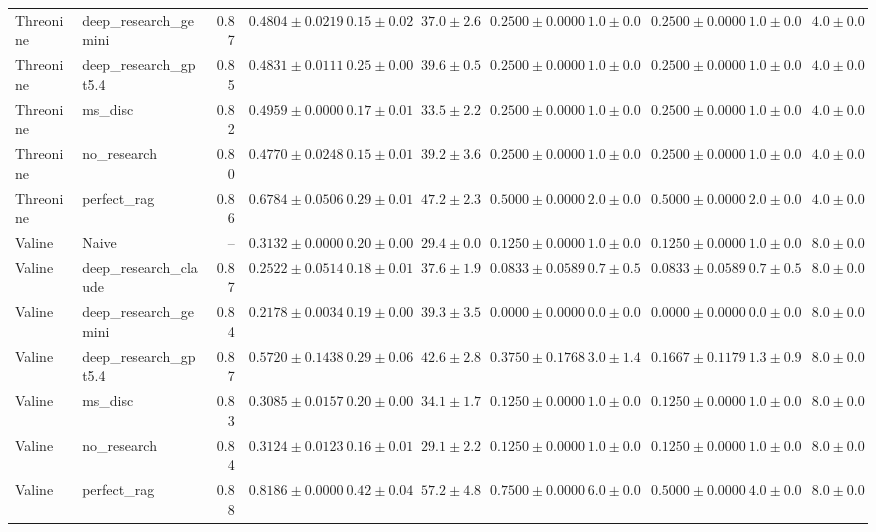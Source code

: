 \begin{table}[htbp]
\begin{tabular}{llrrrrrrrrr}
Threonine & deep_research_gemini & 0.87 & $0.4804 \pm 0.0219$ & $0.15 \pm 0.02$ & $37.0 \pm 2.6$ & $0.2500 \pm 0.0000$ & $1.0 \pm 0.0$ & $0.2500 \pm 0.0000$ & $1.0 \pm 0.0$ & $4.0 \pm 0.0$ \\
Threonine & deep_research_gpt5.4 & 0.85 & $0.4831 \pm 0.0111$ & $0.25 \pm 0.00$ & $39.6 \pm 0.5$ & $0.2500 \pm 0.0000$ & $1.0 \pm 0.0$ & $0.2500 \pm 0.0000$ & $1.0 \pm 0.0$ & $4.0 \pm 0.0$ \\
Threonine & ms_disc & 0.82 & $0.4959 \pm 0.0000$ & $0.17 \pm 0.01$ & $33.5 \pm 2.2$ & $0.2500 \pm 0.0000$ & $1.0 \pm 0.0$ & $0.2500 \pm 0.0000$ & $1.0 \pm 0.0$ & $4.0 \pm 0.0$ \\
Threonine & no_research & 0.80 & $0.4770 \pm 0.0248$ & $0.15 \pm 0.01$ & $39.2 \pm 3.6$ & $0.2500 \pm 0.0000$ & $1.0 \pm 0.0$ & $0.2500 \pm 0.0000$ & $1.0 \pm 0.0$ & $4.0 \pm 0.0$ \\
Threonine & perfect_rag & 0.86 & \cellcolor{green!25}$0.6784 \pm 0.0506$ & $0.29 \pm 0.01$ & $47.2 \pm 2.3$ & $0.5000 \pm 0.0000$ & $2.0 \pm 0.0$ & $0.5000 \pm 0.0000$ & $2.0 \pm 0.0$ & $4.0 \pm 0.0$ \\
\midrule
Valine & Naive & -- & $0.3132 \pm 0.0000$ & $0.20 \pm 0.00$ & $29.4 \pm 0.0$ & $0.1250 \pm 0.0000$ & $1.0 \pm 0.0$ & $0.1250 \pm 0.0000$ & $1.0 \pm 0.0$ & $8.0 \pm 0.0$ \\
Valine & deep_research_claude & 0.87 & $0.2522 \pm 0.0514$ & $0.18 \pm 0.01$ & $37.6 \pm 1.9$ & $0.0833 \pm 0.0589$ & $0.7 \pm 0.5$ & $0.0833 \pm 0.0589$ & $0.7 \pm 0.5$ & $8.0 \pm 0.0$ \\
Valine & deep_research_gemini & 0.84 & \cellcolor{red!25}$0.2178 \pm 0.0034$ & $0.19 \pm 0.00$ & $39.3 \pm 3.5$ & $0.0000 \pm 0.0000$ & $0.0 \pm 0.0$ & $0.0000 \pm 0.0000$ & $0.0 \pm 0.0$ & $8.0 \pm 0.0$ \\
Valine & deep_research_gpt5.4 & 0.87 & $0.5720 \pm 0.1438$ & $0.29 \pm 0.06$ & $42.6 \pm 2.8$ & $0.3750 \pm 0.1768$ & $3.0 \pm 1.4$ & $0.1667 \pm 0.1179$ & $1.3 \pm 0.9$ & $8.0 \pm 0.0$ \\
Valine & ms_disc & 0.83 & $0.3085 \pm 0.0157$ & $0.20 \pm 0.00$ & $34.1 \pm 1.7$ & $0.1250 \pm 0.0000$ & $1.0 \pm 0.0$ & $0.1250 \pm 0.0000$ & $1.0 \pm 0.0$ & $8.0 \pm 0.0$ \\
Valine & no_research & 0.84 & $0.3124 \pm 0.0123$ & $0.16 \pm 0.01$ & $29.1 \pm 2.2$ & $0.1250 \pm 0.0000$ & $1.0 \pm 0.0$ & $0.1250 \pm 0.0000$ & $1.0 \pm 0.0$ & $8.0 \pm 0.0$ \\
Valine & perfect_rag & 0.88 & \cellcolor{green!25}$0.8186 \pm 0.0000$ & $0.42 \pm 0.04$ & $57.2 \pm 4.8$ & $0.7500 \pm 0.0000$ & $6.0 \pm 0.0$ & $0.5000 \pm 0.0000$ & $4.0 \pm 0.0$ & $8.0 \pm 0.0$ \\
\bottomrule
\end{tabular}
\end{table}